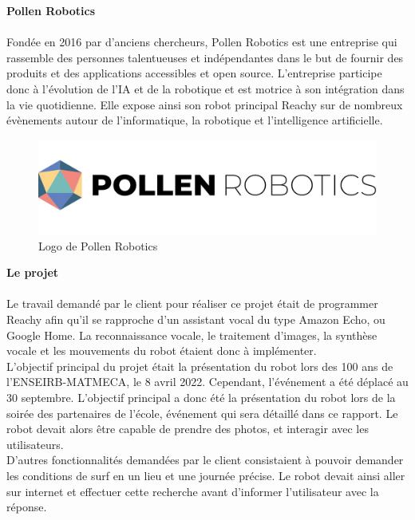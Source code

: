 \documentclass[a4paper,french]{article}
\begin{document}
\textbf{Pollen Robotics} \\ \\
Fondée en 2016 par d'anciens chercheurs, Pollen Robotics est une entreprise qui rassemble des personnes talentueuses et indépendantes dans le but de fournir des produits et des applications accessibles et open source. L'entreprise participe donc à l'évolution de l'IA et de la robotique et est motrice à son intégration dans la vie quotidienne. Elle expose ainsi son robot principal Reachy sur de nombreux évènements autour de l'informatique, la robotique et l'intelligence artificielle. \\


\begin{figure}[H]
    \centering
    \includegraphics[scale = 0.25]{figures/pollen_robotics.jpg}
    \caption{Logo de Pollen Robotics}
    \label{fig:logo}
\end{figure}

\textbf{Le projet} \\ \\
Le travail demandé par le client pour réaliser ce projet était de programmer Reachy afin qu'il se rapproche d'un assistant vocal du type Amazon Echo, ou Google Home. La reconnaissance vocale, le traitement d'images, la synthèse vocale et les mouvements du robot étaient donc à implémenter. \\

L'objectif principal du projet était la présentation du robot lors des 100 ans de l'ENSEIRB-MATMECA, le 8 avril 2022. Cependant, l'événement a été déplacé au 30 septembre. L'objectif principal a donc été la présentation du robot lors de la soirée des partenaires de l'école, événement qui sera détaillé dans ce rapport. Le robot devait alors être capable de prendre des photos, et interagir avec les utilisateurs. \\
D'autres fonctionnalités demandées par le client consistaient à pouvoir demander les conditions de surf en un lieu et une journée précise. Le robot devait ainsi aller sur internet et effectuer cette recherche avant d'informer l'utilisateur avec la réponse. \\
\end{document}
